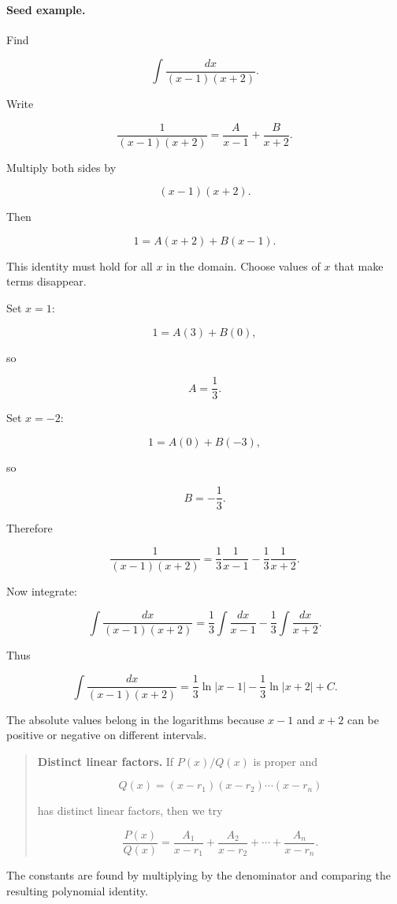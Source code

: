 \paragraph{Seed example.}
Find

\[
\int \frac{dx}{(x-1)(x+2)}.
\]

Write

\[
\frac{1}{(x-1)(x+2)}
=
\frac{A}{x-1}+\frac{B}{x+2}.
\]

Multiply both sides by

\[
(x-1)(x+2).
\]

Then

\[
1=A(x+2)+B(x-1).
\]

This identity must hold for all \(x\) in the domain.  Choose values of \(x\) that make
terms disappear.

Set \(x=1\):

\[
1=A(3)+B(0),
\]

so

\[
A=\frac13.
\]

Set \(x=-2\):

\[
1=A(0)+B(-3),
\]

so

\[
B=-\frac13.
\]

Therefore

\[
\frac{1}{(x-1)(x+2)}
=
\frac{1}{3}\frac{1}{x-1}
-
\frac{1}{3}\frac{1}{x+2}.
\]

Now integrate:

\[
\int \frac{dx}{(x-1)(x+2)}
=
\frac13\int\frac{dx}{x-1}
-
\frac13\int\frac{dx}{x+2}.
\]

Thus

\[
\boxed{
\int \frac{dx}{(x-1)(x+2)}
=
\frac13\ln|x-1|
-
\frac13\ln|x+2|
+C.
}
\]

The absolute values belong in the logarithms because \(x-1\) and \(x+2\) can be
positive or negative on different intervals.

\begin{quote}
\textbf{Distinct linear factors.}
If \(P(x)/Q(x)\) is proper and

\[
Q(x)=(x-r_1)(x-r_2)\cdots(x-r_n)
\]

has distinct linear factors, then we try

\[
\frac{P(x)}{Q(x)}
=
\frac{A_1}{x-r_1}
+
\frac{A_2}{x-r_2}
+\cdots+
\frac{A_n}{x-r_n}.
\]
\end{quote}

The constants are found by multiplying by the denominator and comparing the resulting
polynomial identity.

